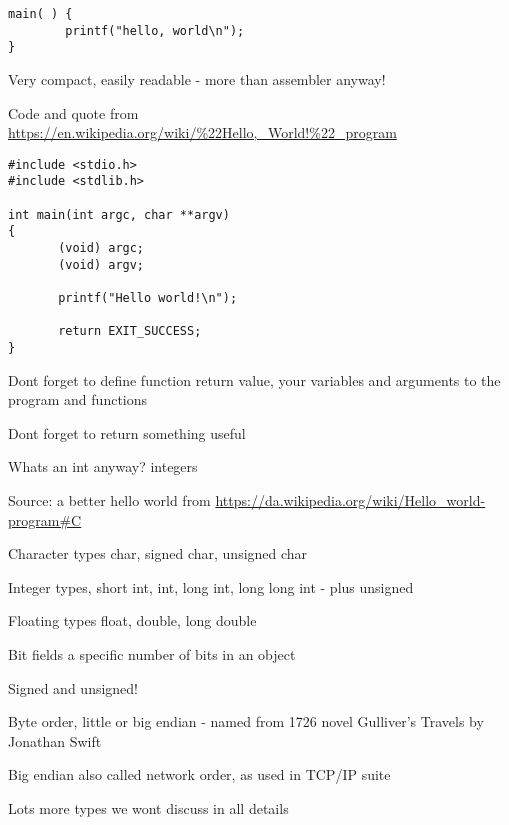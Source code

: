 \documentclass[Screen16to9,17pt]{foils}
\begin{document}
\begin{verbatim}
main( ) {
        printf("hello, world\n");
}
\end{verbatim}

\begin{list2}
\item Very compact, easily readable - more than assembler anyway!
\end{list2}

Code and quote from
\url{https://en.wikipedia.org/wiki/%22Hello,_World!%22_program}


\begin{verbatim}
#include <stdio.h>
#include <stdlib.h>

int main(int argc, char **argv)
{
       (void) argc;
       (void) argv;

       printf("Hello world!\n");

       return EXIT_SUCCESS;
}
\end{verbatim}

\begin{list2}
\item Dont forget to define function return value, your variables and arguments to the program and functions
\item Dont forget to return something useful
\item Whats an int anyway? integers
\end{list2}

Source: a better hello world from \url{https://da.wikipedia.org/wiki/Hello_world-program#C}




\begin{list2}
\item Character types char, signed char, unsigned char
\item Integer types, short int, int, long int, long long int - plus unsigned
\item Floating types float, double, long double
\item Bit fields a specific number of bits in an object
\item Signed and unsigned!
\item Byte order, little or big endian - named from 1726 novel Gulliver's Travels by Jonathan Swift
\item Big endian also called network order, as used in TCP/IP suite
\item Lots more types we wont discuss in all details
\end{list2}
\end{document}
